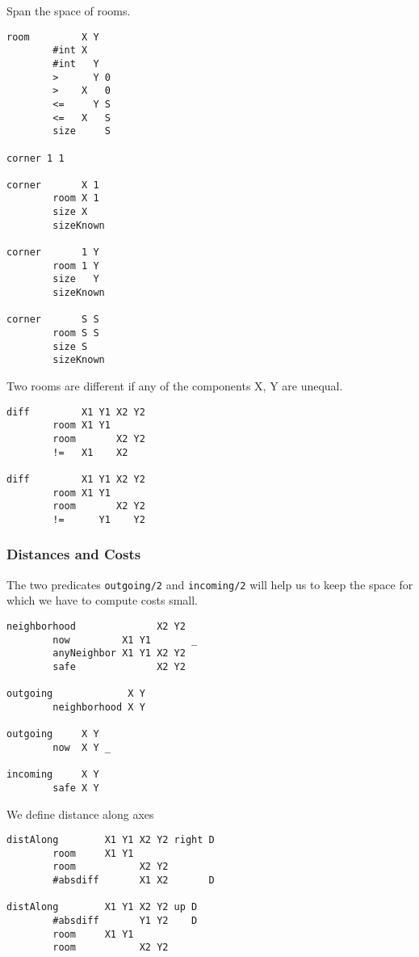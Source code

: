 Span the space of rooms.

\begin{verbatim}
room         X Y
        #int X
        #int   Y
        >      Y 0
        >    X   0
        <=     Y S
        <=   X   S
        size     S

corner 1 1

corner       X 1
        room X 1
        size X
        sizeKnown

corner       1 Y
        room 1 Y
        size   Y
        sizeKnown

corner       S S
        room S S
        size S
        sizeKnown
\end{verbatim}

Two rooms are different if any of the components X, Y are unequal.

\begin{verbatim}
diff         X1 Y1 X2 Y2
        room X1 Y1
        room       X2 Y2
        !=   X1    X2

diff         X1 Y1 X2 Y2
        room X1 Y1
        room       X2 Y2
        !=      Y1    Y2
\end{verbatim}

\hypertarget{distances-and-costs}{%
\subsubsection{Distances and Costs}\label{distances-and-costs}}

The two predicates \texttt{outgoing/2} and \texttt{incoming/2} will help
us to keep the space for which we have to compute costs small.

\begin{verbatim}
neighborhood              X2 Y2
        now         X1 Y1       _
        anyNeighbor X1 Y1 X2 Y2
        safe              X2 Y2

outgoing             X Y
        neighborhood X Y

outgoing     X Y
        now  X Y _

incoming     X Y
        safe X Y
\end{verbatim}

We define distance along axes

\begin{verbatim}
distAlong        X1 Y1 X2 Y2 right D
        room     X1 Y1
        room           X2 Y2
        #absdiff       X1 X2       D

distAlong        X1 Y1 X2 Y2 up D
        #absdiff       Y1 Y2    D
        room     X1 Y1
        room           X2 Y2
\end{verbatim}

